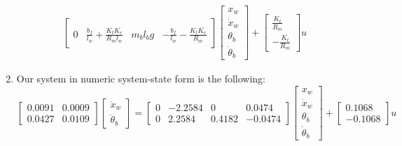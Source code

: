 \documentclass[11pt]{article} %
\begin{document}
\begin{enumerate}
\begin{equation*}
\begin{aligned}
\begin{bmatrix}
        \\[1.2em]
        0 &
        \frac{b_f}{l_w} + \frac{K_t K_e}{R_m l_w} &
        m_b l_b g &
        - \frac{b_f}{l_w} - \frac{K_t K_e}{R_m}
      \end{bmatrix}
      \begin{bmatrix}
        x_w\\
        \dot{x}_w\\
        \theta_b\\
        \dot{\theta}_b
      \end{bmatrix}
      +
      \begin{bmatrix}
        \frac{K_t}{R_m} \\[1.2em]
        -\frac{K_t}{R_m}
      \end{bmatrix}
      u
    \end{aligned}
  \end{equation*}
\item %
  Our system in numeric system-state form is the following:
  \begin{equation}\label{eq:numeric-ss}
    \begin{bmatrix}
      0.0091 & 0.0009 \\
      0.0427 & 0.0109
    \end{bmatrix}
    \begin{bmatrix}
      \ddot{x}_w \\
      \ddot{\theta}_b
    \end{bmatrix}
    =
    \begin{bmatrix}
      0 & -2.2584 & 0 & 0.0474 \\
      0 & 2.2584 & 0.4182 & -0.0474
    \end{bmatrix}
    \begin{bmatrix}
      x_w\\
      \dot{x}_w\\
      \theta_b\\
      \dot{\theta}_b
    \end{bmatrix}
    +
    \begin{bmatrix}
      0.1068 \\
      -0.1068
    \end{bmatrix}
    u
  \end{equation}
\end{enumerate}
\end{document}
